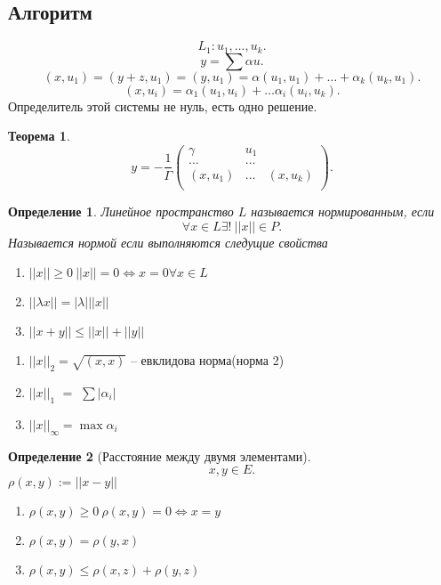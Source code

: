 \documentclass{scrartcl}
\newtheorem{theorem}{Теорема}
\newtheorem{definition}{Определение}
\begin{document}
\subsection{Алгоритм}
\[
L_1:u_1,\dots,u_{k}
.\] 
\[
y = \sum \alpha u
.\] 
\[
    (x,u_1) =(y + z,u_1) = (y,u_1) = \alpha (u_1,u_1) + \dots + \alpha_{k} (u_{k},u_1)
.\] 
\[
    (x ,u_{i}) =  \alpha_1 (u_1,u_{i}) + \dots \alpha_{i}(u_{i},u_{k})
.\] 
Определитель этой системы не нуль, есть одно решение.
\begin{theorem}
    \[
    y = - \frac{1}{\Gamma} 
    \begin{pmatrix} 
        \gamma & u_1\\
        \dots & \dots \\
        (x,u_1) & \dots & (x,u_{k}) \\
    \end{pmatrix} 
    .\] 
\end{theorem}
\begin{definition}
    Линейное пространство $L$ называется нормированным, если
    \[
    \forall  x \in L \exists! ~  ||x|| \in P
    .\]
    Называется нормой если выполняются следущие свойства
    \begin{enumerate}
        \item $||x|| \ge  0~ ||x|| = 0 \iff x = 0 \forall  x \in L$
        \item $||\lambda x|| = |\lambda| ||x||$
        \item $||x + y|| \le ||x|| + || y||$
    \end{enumerate}
\end{definition}
\begin{enumerate}
    \item $||x||_{2} = \sqrt{(x,x)} $ -- евклидова норма(норма 2)
    \item $||x||_{1}$ $=$ $\sum |\alpha_{i}|$ 
    \item $||x||_{\infty} = \max{\alpha_{i}}$
\end{enumerate}
\begin{definition}[Расстояние между двумя элементами]
    \[
    x,y \in E
    .\] 
    $\rho(x,y) := || x - y ||$
\end{definition}
\begin{enumerate}
    \item $\rho(x,y) \ge  0 ~ \rho(x,y) = 0 \iff x = y$
    \item $\rho(x,y) = \rho(y,x)$
    \item $\rho(x,y)  \le \rho(x,z) + \rho(y,z) $
\end{enumerate}
\end{document}
